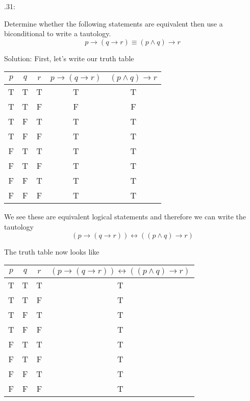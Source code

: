 \documentclass[16 pt]{amsart}
\theoremstyle{definition}
\theoremstyle{remark}
\numberwithin{equation}{subsection}
\begin{document}
.31:

Determine whether the following statements are equivalent then use a biconditional to write a tautology.
\[
p \rightarrow (q \rightarrow r) \equiv (p \wedge q) \rightarrow r
\]

\vspace{1in}

Solution: First, let's write our truth table


\begin{center}
  \begin{tabular}{ c | c | c | c | c}
    
    $p$ & $q$ & $r$ & $p \rightarrow (q \rightarrow r)$  &  $(p\wedge q)\rightarrow r$\\ \hline
    T & T & T & T & T\\ 
    T & T & F & F & F\\
    T & F & T & T & T\\
    T & F & F & T & T\\
    F & T & T & T & T\\
    F & T & F & T & T\\
    F & F & T & T & T\\
    F & F & F & T & T\\
  \end{tabular}
\end{center}


We see these are equivalent logical statements and therefore we can write the tautology
\[
(p \rightarrow (q \rightarrow r)) \leftrightarrow ((p\wedge q)\rightarrow r)
\]

The truth table now looks like

\begin{center}
  \begin{tabular}{ c | c | c | c }
    
    $p$ & $q$ & $r$ & $(p \rightarrow (q \rightarrow r))  \leftrightarrow  ((p\wedge q)\rightarrow r)$\\ \hline
    T & T & T & T\\ 
    T & T & F & T\\
    T & F & T & T\\
    T & F & F & T\\
    F & T & T & T\\
    F & T & F & T\\
    F & F & T & T\\
    F & F & F & T\\
  \end{tabular}
\end{center}
\end{document}
